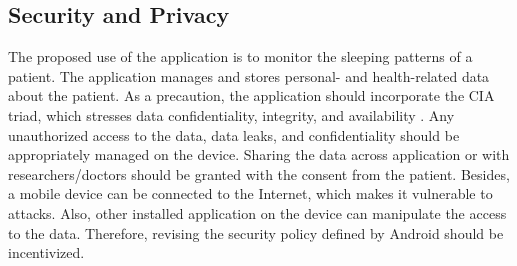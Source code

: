 \subsection{Security and Privacy}
The proposed use of the application is to monitor the sleeping patterns of a patient. The application manages and stores personal- and health-related data about the patient. As a precaution, the application should incorporate the CIA triad, which stresses data confidentiality, integrity, and availability \cite{cia}. Any unauthorized access to the data, data leaks, and confidentiality should be appropriately managed on the device. Sharing the data across application or with researchers/doctors should be granted with the consent from the patient.  Besides, a mobile device can be connected to the Internet, which makes it vulnerable to attacks. Also, other installed application on the device can manipulate the access to the data. Therefore, revising the security policy defined by Android \cite{androidsecurity} should be incentivized. 